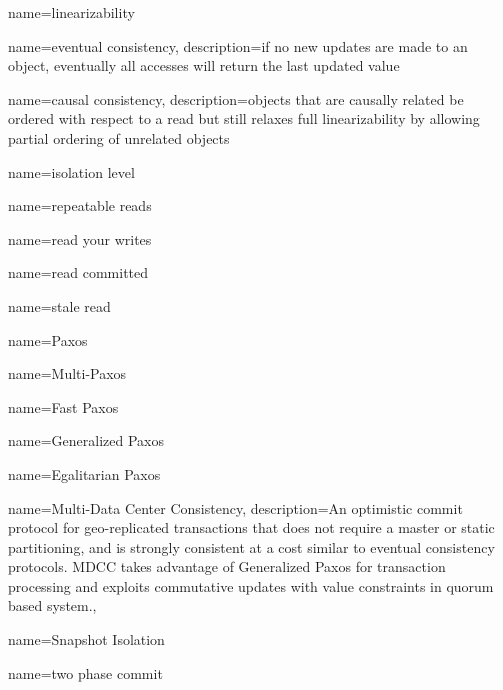 %
%
%
%

{
    name=linearizability
}

{
    name={eventual consistency},
    description={if no new updates are made to an object, eventually all accesses will return the last updated value}
}

{
    name={causal consistency},
    description={objects that are causally related be ordered with respect to a read but still relaxes full linearizability by allowing partial ordering of unrelated objects}
}

{
    name={isolation level}
}

{
    name={repeatable reads}
}

{
    name={read your writes}
}

{
    name={read committed}
}

{
    name={stale read}
}

{
    name={Paxos}
}

{
    name={Multi-Paxos}
}

{
    name={Fast Paxos}
}

{
    name={Generalized Paxos}
}

{
    name={Egalitarian Paxos}
}

 {
  name={Multi-Data Center Consistency},
  description={An optimistic commit protocol for geo-replicated transactions that does not require a master or static partitioning, and is strongly consistent at a cost similar to eventual consistency protocols. MDCC takes advantage of Generalized Paxos for transaction processing and exploits commutative updates with value constraints in quorum based system.},
}

 {
    name={Snapshot Isolation}
}

\newglossaryentry{2pc} {
    name={two phase commit}
}

